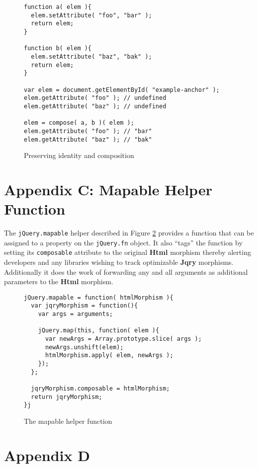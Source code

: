 \documentclass[preprint]{sigplanconf}
\begin{document}
\begin{figure}[!ht]
\small
\begin{verbatim}
function a( elem ){
  elem.setAttribute( "foo", "bar" );
  return elem;
}

function b( elem ){
  elem.setAttribute( "baz", "bak" );
  return elem;
}

var elem = document.getElementById( "example-anchor" );
elem.getAttribute( "foo" ); // undefined
elem.getAttribute( "baz" ); // undefined

elem = compose( a, b )( elem );
elem.getAttribute( "foo" ); // "bar"
elem.getAttribute( "baz" ); // "bak"
\end{verbatim}
\nocaptionrule \caption{Preserving identity and composition}
\label{fig:html-compose}
\end{figure}

\section{Appendix C: Mapable Helper Function}

The \verb|jQuery.mapable| helper described in Figure \ref{fig:mapable} provides a function that can be assigned to a property on the \verb|jQuery.fn| object. It also ``tags'' the function by setting its \verb|composable| attribute to the original \textbf{Html} morphism thereby alerting developers and any libraries wishing to track optimizable \textbf{Jqry} morphisms. Additionally it does the work of forwarding any and all arguments as additional parameters to the \textbf{Html} morphism.

\begin{figure}[!ht]
\small
\begin{verbatim}
jQuery.mapable = function( htmlMorphism ){
  var jqryMorphism = function(){
    var args = arguments;

    jQuery.map(this, function( elem ){
      var newArgs = Array.prototype.slice( args );
      newArgs.unshift(elem);
      htmlMorphism.apply( elem, newArgs );
    });
  };

  jqryMorphism.composable = htmlMorphism;
  return jqryMorphism;
}j
\end{verbatim}
\nocaptionrule \caption{The mapable helper function}
\label{fig:mapable}
\end{figure}

\section{Appendix D}
\end{document}
